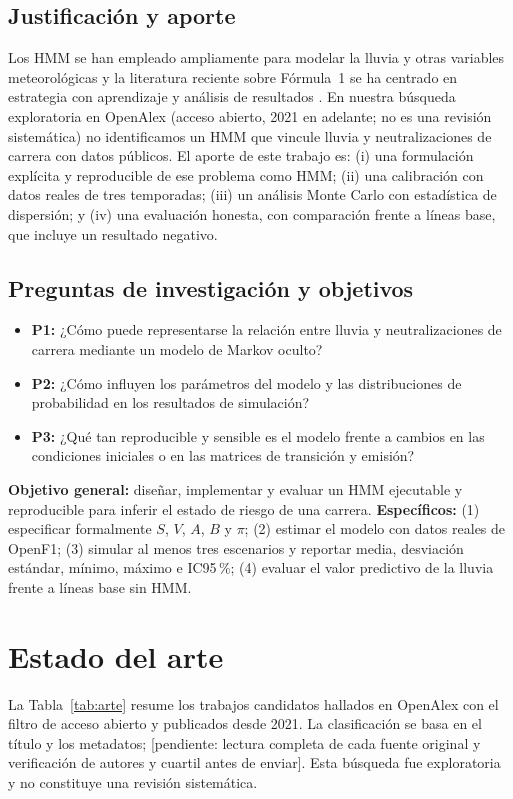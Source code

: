 \documentclass[11pt,letterpaper]{article}
\newcommand{\pend}[1]{\textcolor{red!70!black}{[#1]}}
\begin{document}
\subsection{Justificación y aporte}
Los HMM se han empleado ampliamente para modelar la lluvia y otras variables meteorológicas \cite{r1,r2,r3,r4,r6,r7} y la literatura reciente sobre Fórmula~1 se ha centrado en estrategia con aprendizaje \cite{r11,r12} y análisis de resultados \cite{r10}. En nuestra búsqueda exploratoria en OpenAlex (acceso abierto, 2021 en adelante; no es una revisión sistemática) no identificamos un HMM que vincule lluvia y neutralizaciones de carrera con datos públicos. El aporte de este trabajo es: (i) una formulación explícita y reproducible de ese problema como HMM; (ii) una calibración con datos reales de tres temporadas; (iii) un análisis Monte Carlo con estadística de dispersión; y (iv) una evaluación honesta, con comparación frente a líneas base, que incluye un resultado negativo.

\subsection{Preguntas de investigación y objetivos}
\begin{itemize}[leftmargin=1.2cm,itemsep=1pt]
\item \textbf{P1:} ¿Cómo puede representarse la relación entre lluvia y neutralizaciones de carrera mediante un modelo de Markov oculto?
\item \textbf{P2:} ¿Cómo influyen los parámetros del modelo y las distribuciones de probabilidad en los resultados de simulación?
\item \textbf{P3:} ¿Qué tan reproducible y sensible es el modelo frente a cambios en las condiciones iniciales o en las matrices de transición y emisión?
\end{itemize}
\textbf{Objetivo general:} diseñar, implementar y evaluar un HMM ejecutable y reproducible para inferir el estado de riesgo de una carrera. \textbf{Específicos:} (1) especificar formalmente $S$, $V$, $A$, $B$ y $\pi$; (2) estimar el modelo con datos reales de OpenF1; (3) simular al menos tres escenarios y reportar media, desviación estándar, mínimo, máximo e IC95\,\%; (4) evaluar el valor predictivo de la lluvia frente a líneas base sin HMM.

\section{Estado del arte}
\label{sec:arte}
La Tabla~\ref{tab:arte} resume los trabajos candidatos hallados en OpenAlex con el filtro de acceso abierto y publicados desde 2021. La clasificación se basa en el título y los metadatos; \pend{pendiente: lectura completa de cada fuente original y verificación de autores y cuartil antes de enviar}. Esta búsqueda fue exploratoria y no constituye una revisión sistemática.
\end{document}

